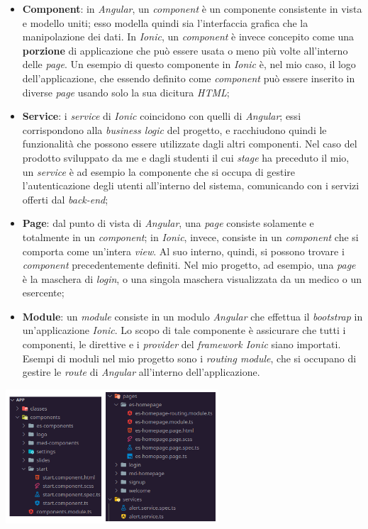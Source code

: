 \begin{itemize}
  \item \textbf{Component}: in \textit{Angular}, un \textit{component} è un componente consistente in vista e modello uniti; esso modella quindi sia l'interfaccia grafica che la manipolazione dei dati. In \textit{Ionic}, un \textit{component} è invece concepito come una \textbf{porzione} di applicazione che può essere usata o meno più volte all'interno delle \textit{page}. Un esempio di questo componente in \textit{Ionic} è, nel mio caso, il logo dell'applicazione, che essendo definito come \textit{component} può essere inserito in diverse \textit{page} usando solo la sua dicitura \textit{HTML};
  \item \textbf{Service}: i \textit{service} di \textit{Ionic} coincidono con quelli di \textit{Angular}; essi corrispondono alla \textit{business logic} del progetto, e racchiudono quindi le funzionalità che possono essere utilizzate dagli altri componenti. Nel caso del prodotto sviluppato da me e dagli studenti il cui \textit{stage} ha preceduto il mio, un \textit{service} è ad esempio la componente che si occupa di gestire l'autenticazione degli utenti all'interno del sistema, comunicando con i servizi offerti dal \textit{back-end};
  \item \textbf{Page}: dal punto di vista di \textit{Angular}, una \textit{page} consiste solamente e totalmente in un \textit{component}; in \textit{Ionic}, invece, consiste in un \textit{component} che si comporta come un'intera \textit{view}. Al suo interno, quindi, si possono trovare i \textit{component} precedentemente definiti. Nel mio progetto, ad esempio, una \textit{page} è la maschera di \textit{login}, o una singola maschera visualizzata da un medico o un esercente;
  \item \textbf{Module}: un \textit{module} consiste in un modulo \textit{Angular} che effettua il \textit{bootstrap} in un'applicazione \textit{Ionic}. Lo scopo di tale componente è assicurare che tutti i componenti, le direttive e i \textit{provider} del \textit{framework Ionic} siano importati. Esempi di moduli nel mio progetto sono i \textit{routing module}, che si occupano di gestire le \textit{route} di \textit{Angular} all'interno dell'applicazione.
\end{itemize}
\newpage

\begin{minipage}{\linewidth}
  \centering
    \includegraphics[height=5cm]{immagini/directory}
\end{minipage} \\

